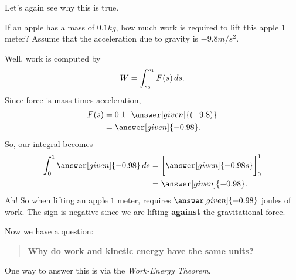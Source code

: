 \documentclass{ximera}
\begin{document}
	Let's again see why this is true.
	\begin{example}
		If an apple has a mass of $0.1\unit{kg}$, how much work is required
		to lift this apple $1$ meter?  Assume that the acceleration due to
		gravity is $-9.8\unit{m}/\unit{s}^2$.
		\begin{explanation}
			Well, work is computed by
			\[
			W = \int_{s_0}^{s_1} F(s) \mathop{}\!d s.
			\]
			Since force is mass times acceleration,
			\begin{align*}
				F(s) &= 0.1\cdot \answer[given]{(-9.8)} \\
				&= \answer[given]{-0.98}.
			\end{align*}
			So, our integral becomes
			\begin{align*}
				\int_{0}^{1} \answer[given]{-0.98} \d s &= \eval{\answer[given]{-0.98 s}}_0^1\\
				&=\answer[given]{-0.98}.
			\end{align*}
			Ah! So when lifting an apple $1$ meter, requires $\answer[given]{-0.98}$ joules of
			work. The sign is negative since we are lifting \textbf{against}
			the gravitational force.
		\end{explanation}
	\end{example}
	
	
	
	Now we have a question:
	\begin{quote}
		\textbf{Why do work and kinetic energy have the same units?}
	\end{quote}
	
	One way to answer this is via the \textit{Work-Energy Theorem}.
	
\end{document}
